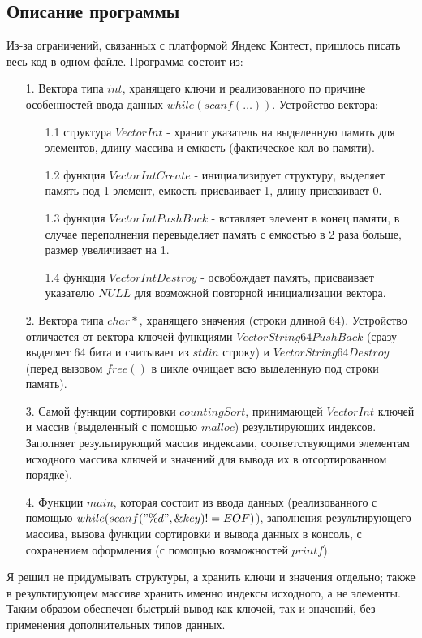\documentclass[12pt]{article}
\begin{document}
	\subsection*{Описание программы}
	
	Из-за ограничений, связанных с платформой Яндекс Контест, пришлось писать весь код в одном файле. Программа состоит из:
	\begin{enumerate}
		\item[1.] Вектора типа $int$, хранящего ключи и реализованного по причине особенностей ввода данных $while (scanf(\dots))$. Устройство вектора:
		\begin{enumerate}
			\item[1.1] структура $VectorInt$ - хранит указатель на выделенную память для элементов, длину массива и емкость (фактическое кол-во памяти).
			\item[1.2] функция $VectorIntCreate$ - инициализирует структуру, выделяет память под 1 элемент, емкость присваивает 1, длину присваивает 0.
			\item[1.3] функция $VectorIntPushBack$ - вставляет элемент в конец памяти, в случае переполнения перевыделяет память с емкостью в 2 раза больше, размер увеличивает на 1.
			\item[1.4] функция $VectorIntDestroy$ - освобождает память, присваивает указателю $NULL$ для возможной повторной инициализации вектора.  
		\end{enumerate}
		\item[2.] Вектора типа $char *$, хранящего значения (строки длиной 64). Устройство отличается от вектора ключей функциями $VectorString64PushBack$ (сразу выделяет 64 бита и считывает из $stdin$ строку) и $VectorString64Destroy$ (перед вызовом $free()$ в цикле очищает всю выделенную под строки память).
		\item[3.] Самой функции сортировки $countingSort$, принимающей $VectorInt$ ключей и массив (выделенный с помощью $malloc$) результирующих индексов. Заполняет результирующий массив индексами, соответствующими элементам исходного массива ключей и значений для вывода их в отсортированном порядке).
		\item[4.] Функции $main$, которая состоит из ввода данных (реализованного с помощью $while (scanf("\%d", \&key) != EOF) $), заполнения результирующего массива, вызова функции сортировки и вывода данных в консоль, с сохранением оформления (с помощью возможностей $printf$).  
	\end{enumerate}
	Я решил не придумывать структуры, а хранить ключи и значения отдельно; также в результирующем массиве хранить именно индексы исходного, а не элементы. Таким образом обеспечен быстрый вывод как ключей, так и значений, без применения дополнительных типов данных.
	
\end{document}
